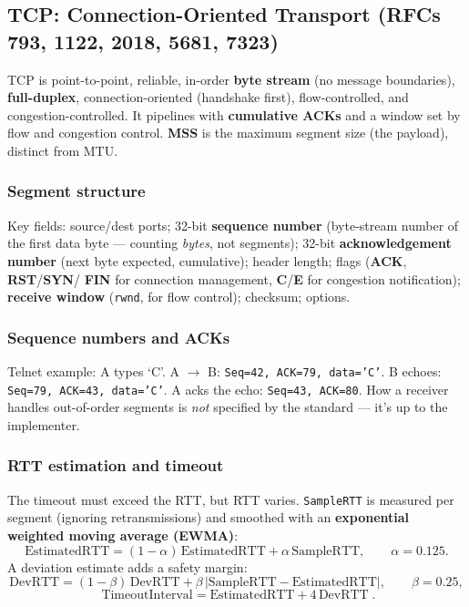 \documentclass[hidelinks]{article}
\begin{document}
\subsection{TCP: Connection-Oriented Transport (RFCs 793, 1122, 2018, 5681, 7323)}

TCP is point-to-point, reliable, in-order \textbf{byte stream}
(no message boundaries), \textbf{full-duplex}, connection-oriented
(handshake first), flow-controlled, and congestion-controlled. It pipelines
with \textbf{cumulative ACKs} and a window set by flow and congestion
control. \textbf{MSS} is the maximum segment size (the payload), distinct
from MTU.

\subsubsection{Segment structure}
Key fields: source/dest ports; 32-bit \textbf{sequence number}
(byte-stream number of the first data byte --- counting \emph{bytes}, not
segments); 32-bit \textbf{acknowledgement number} (next byte expected,
cumulative); header length; flags (\textbf{ACK}, \textbf{RST}/\textbf{SYN}/
\textbf{FIN} for connection management, \textbf{C}/\textbf{E} for congestion
notification); \textbf{receive window} (\texttt{rwnd}, for flow control);
checksum; options.

\subsubsection{Sequence numbers and ACKs}
Telnet example: A types `C'. A $\to$ B: \texttt{Seq=42, ACK=79, data='C'}.
B echoes: \texttt{Seq=79, ACK=43, data='C'}. A acks the echo:
\texttt{Seq=43, ACK=80}. How a receiver handles out-of-order segments is
\emph{not} specified by the standard --- it's up to the implementer.

\subsubsection{RTT estimation and timeout}
The timeout must exceed the RTT, but RTT varies. \texttt{SampleRTT} is
measured per segment (ignoring retransmissions) and smoothed with an
\textbf{exponential weighted moving average (EWMA)}:
\[
    \text{EstimatedRTT} = (1-\alpha)\,\text{EstimatedRTT}
                        + \alpha\,\text{SampleRTT},
    \qquad \alpha = 0.125.
\]
A deviation estimate adds a safety margin:
\[
    \text{DevRTT} = (1-\beta)\,\text{DevRTT}
                  + \beta\,|\text{SampleRTT} - \text{EstimatedRTT}|,
    \qquad \beta = 0.25,
\]
\[
    \boxed{\;\text{TimeoutInterval} = \text{EstimatedRTT} + 4\,\text{DevRTT}\;}.
\]
\end{document}

